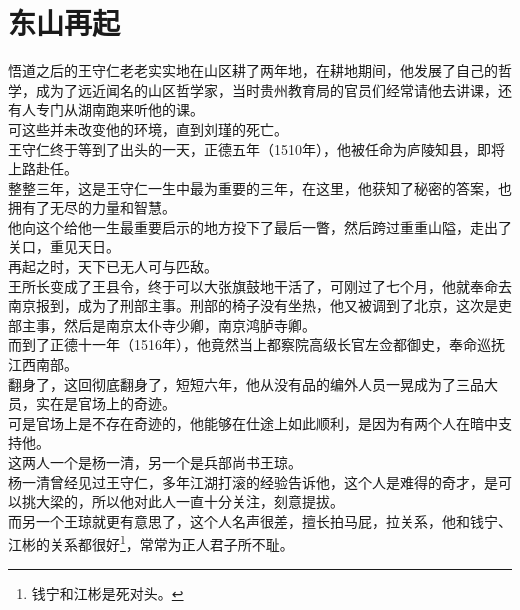 \section{东山再起}
\ifnum{}
	\begin{multicols}{\theparacolNo}
\fi
悟道之后的王守仁老老实实地在山区耕了两年地，在耕地期间，他发展了自己的哲学，成为了远近闻名的山区哲学家，当时贵州教育局的官员们经常请他去讲课，还有人专门从湖南跑来听他的课。\\

可这些并未改变他的环境，直到刘瑾的死亡。\\

王守仁终于等到了出头的一天，正德五年（1510年），他被任命为庐陵知县，即将上路赴任。\\

整整三年，这是王守仁一生中最为重要的三年，在这里，他获知了秘密的答案，也拥有了无尽的力量和智慧。\\

他向这个给他一生最重要启示的地方投下了最后一瞥，然后跨过重重山隘，走出了关口，重见天日。\\

再起之时，天下已无人可与匹敌。\\

王所长变成了王县令，终于可以大张旗鼓地干活了，可刚过了七个月，他就奉命去南京报到，成为了刑部主事。刑部的椅子没有坐热，他又被调到了北京，这次是吏部主事，然后是南京太仆寺少卿，南京鸿胪寺卿。\\

而到了正德十一年（1516年），他竟然当上都察院高级长官左佥都御史，奉命巡抚江西南部。\\

翻身了，这回彻底翻身了，短短六年，他从没有品的编外人员一晃成为了三品大员，实在是官场上的奇迹。\\

可是官场上是不存在奇迹的，他能够在仕途上如此顺利，是因为有两个人在暗中支持他。\\

这两人一个是杨一清，另一个是兵部尚书王琼。\\

杨一清曾经见过王守仁，多年江湖打滚的经验告诉他，这个人是难得的奇才，是可以挑大梁的，所以他对此人一直十分关注，刻意提拔。\\

而另一个王琼就更有意思了，这个人名声很差，擅长拍马屁，拉关系，他和钱宁、江彬的关系都很好\footnote{钱宁和江彬是死对头。}，常常为正人君子所不耻。\\


\end{multicols}

